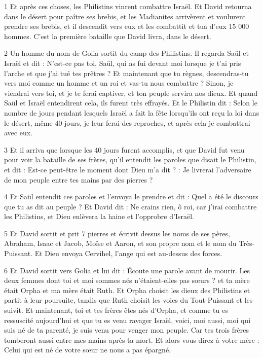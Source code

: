 \par 1 Et après ces choses, les Philistins vinrent combattre Israël. Et David retourna dans le désert pour paître ses brebis, et les Madianites arrivèrent et voulurent prendre ses brebis, et il descendit vers eux et les combattit et tua d'eux 15 000 hommes. C'est la première bataille que David livra, dans le désert.

\par 2 Un homme du nom de Golia sortit du camp des Philistins. Il regarda Saül et Israël et dit : N'est-ce pas toi, Saül, qui as fui devant moi lorsque je t'ai pris l'arche et que j'ai tué tes prêtres ? Et maintenant que tu règnes, descendras-tu vers moi comme un homme et un roi et vas-tu nous combattre ? Sinon, je viendrai vers toi, et je te ferai captiver, et ton peuple servira nos dieux. Et quand Saül et Israël entendirent cela, ils furent très effrayés. Et le Philistin dit : Selon le nombre de jours pendant lesquels Israël a fait la fête lorsqu'ils ont reçu la loi dans le désert, même 40 jours, je leur ferai des reproches, et après cela je combattrai avec eux.

\par 3 Et il arriva que lorsque les 40 jours furent accomplis, et que David fut venu pour voir la bataille de ses frères, qu'il entendit les paroles que disait le Philistin, et dit : Est-ce peut-être le moment dont Dieu m'a dit ? : Je livrerai l'adversaire de mon peuple entre tes mains par des pierres ?

\par 4 Et Saül entendit ces paroles et l'envoya le prendre et dit : Quel a été le discours que tu as dit au peuple ? Et David dit : Ne crains rien, ô roi, car j'irai combattre les Philistins, et Dieu enlèvera la haine et l'opprobre d'Israël.

\par 5 Et David sortit et prit 7 pierres et écrivit dessus les noms de ses pères, Abraham, Isaac et Jacob, Moïse et Aaron, et son propre nom et le nom du Très-Puissant. Et Dieu envoya Cervihel, l'ange qui est au-dessus des forces.

\par 6 Et David sortit vers Golia et lui dit : Écoute une parole avant de mourir. Les deux femmes dont toi et moi sommes nés n'étaient-elles pas sœurs ? et ta mère était Orpha et ma mère était Ruth. Et Orpha choisit les dieux des Philistins et partit à leur poursuite, tandis que Ruth choisit les voies du Tout-Puissant et les suivit. Et maintenant, toi et tes frères êtes nés d'Orpha, et comme tu es ressuscité aujourd'hui et que tu es venu ravager Israël, voici, moi aussi, moi qui suis né de ta parenté, je suis venu pour venger mon peuple. Car tes trois frères tomberont aussi entre mes mains après ta mort. Et alors vous direz à votre mère : Celui qui est né de votre sœur ne nous a pas épargné.

